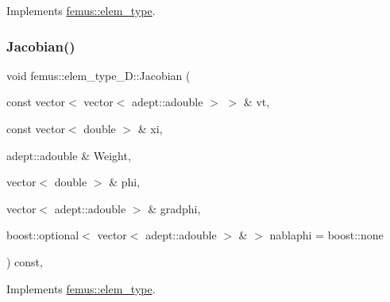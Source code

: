 Implements \mbox{\hyperlink{classfemus_1_1elem__type_ac3828ecd8ddd057d726a60cb19c60f0b}{femus\+::elem\+\_\+type}}.

\mbox{\label{classfemus_1_1elem__type__3_d_a277615099e6e69b4aed9e1cd9e84817d}} 
\subsubsection{\texorpdfstring{Jacobian()}{Jacobian()}\hspace{0.1cm}{\footnotesize\ttfamily [3/4]}}
{\footnotesize\ttfamily void femus\+::elem\+\_\+type\+\_\+D\+::\+Jacobian (\begin{DoxyParamCaption}\item[{const vector$<$ vector$<$ adept\+::adouble $>$ $>$ \&}]{vt,  }\item[{const vector$<$ double $>$ \&}]{xi,  }\item[{adept\+::adouble \&}]{Weight,  }\item[{vector$<$ double $>$ \&}]{phi,  }\item[{vector$<$ adept\+::adouble $>$ \&}]{gradphi,  }\item[{boost\+::optional$<$ vector$<$ adept\+::adouble $>$ \& $>$}]{nablaphi = {\ttfamily boost\+:\+:none} }\end{DoxyParamCaption}) const\hspace{0.3cm}{\ttfamily [inline]}, {\ttfamily [virtual]}}



Implements \mbox{\hyperlink{classfemus_1_1elem__type_a2d76133387cebf896c0e51459055fdea}{femus\+::elem\+\_\+type}}.

\mbox{\label{classfemus_1_1elem__type__3_d_a53f0fe22a3df82bab547a2578d66d7c6}} 
